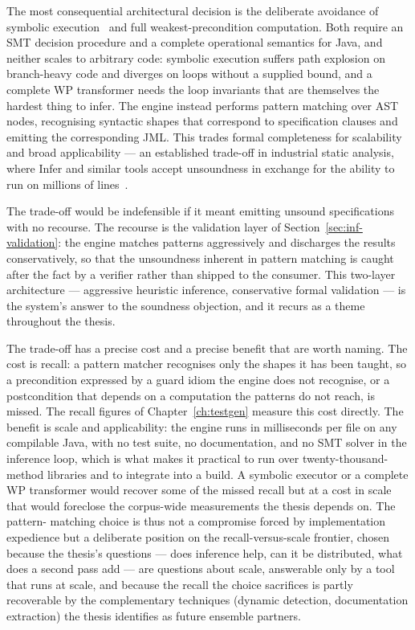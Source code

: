 The most consequential architectural decision is the deliberate avoidance of
symbolic execution~\cite{king1976symbolic, cadar2008klee} and full
weakest-precondition computation. Both require an SMT decision procedure and a
complete operational semantics for Java, and neither scales to arbitrary code:
symbolic execution suffers path explosion on branch-heavy code and diverges on
loops without a supplied bound, and a complete WP transformer needs the loop
invariants that are themselves the hardest thing to infer. The engine instead
performs pattern matching over AST nodes, recognising syntactic shapes that
correspond to specification clauses and emitting the corresponding JML. This
trades formal completeness for scalability and broad applicability --- an
established trade-off in industrial static analysis, where Infer and similar
tools accept unsoundness in exchange for the ability to run on millions of
lines~\cite{calcagno2015infer}.

The trade-off would be indefensible if it meant emitting unsound
specifications with no recourse. The recourse is the validation layer of
Section~\ref{sec:inf-validation}: the engine matches patterns aggressively and
discharges the results conservatively, so that the unsoundness inherent in
pattern matching is caught after the fact by a verifier rather than shipped to
the consumer. This two-layer architecture --- aggressive heuristic inference,
conservative formal validation --- is the system's answer to the soundness
objection, and it recurs as a theme throughout the thesis.

The trade-off has a precise cost and a precise benefit that are worth naming. The
cost is recall: a pattern matcher recognises only the shapes it has been taught,
so a precondition expressed by a guard idiom the engine does not recognise, or a
postcondition that depends on a computation the patterns do not reach, is missed.
The recall figures of Chapter~\ref{ch:testgen} measure this cost directly. The
benefit is scale and applicability: the engine runs in milliseconds per file on
any compilable Java, with no test suite, no documentation, and no SMT solver in the
inference loop, which is what makes it practical to run over twenty-thousand-method
libraries and to integrate into a build. A symbolic executor or a complete WP
transformer would recover some of the missed recall but at a cost in scale that
would foreclose the corpus-wide measurements the thesis depends on. The pattern-
matching choice is thus not a compromise forced by implementation expedience but a
deliberate position on the recall-versus-scale frontier, chosen because the thesis's
questions --- does inference help, can it be distributed, what does a second pass
add --- are questions about scale, answerable only by a tool that runs at scale,
and because the recall the choice sacrifices is partly recoverable by the
complementary techniques (dynamic detection, documentation extraction) the thesis
identifies as future ensemble partners.

